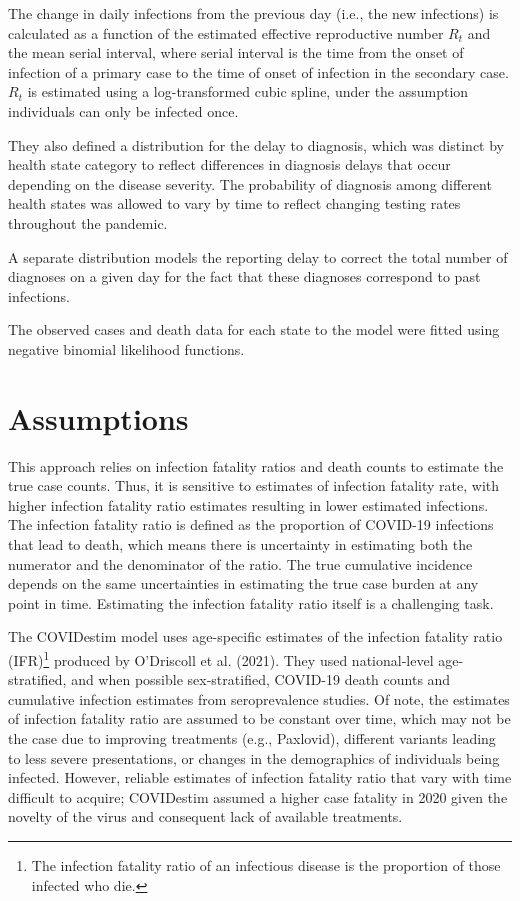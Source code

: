 \documentclass[12pt,twoside]{smiththesis}
\begin{document}
The change in daily infections from the previous day (i.e., the new infections) is calculated as a function of the estimated effective reproductive number \(R_t\) and the mean serial interval, where serial interval is the time from the onset of infection of a primary case to the time of onset of infection in the secondary case. \(R_t\) is estimated using a log-transformed cubic spline, under the assumption individuals can only be infected once.

They also defined a distribution for the delay to diagnosis, which was distinct by health state category to reflect differences in diagnosis delays that occur depending on the disease severity.
The probability of diagnosis among different health states was allowed to vary by time to reflect changing testing rates throughout the pandemic.

A separate distribution models the reporting delay to correct the total number of diagnoses on a given day for the fact that these diagnoses correspond to past infections.

The observed cases and death data for each state to the model were fitted using negative binomial likelihood functions.

\hypertarget{assumptions}{%
\section{Assumptions}\label{assumptions}}

This approach relies on infection fatality ratios and death counts to estimate the true case counts. Thus, it is sensitive to estimates of infection fatality rate, with higher infection fatality ratio estimates resulting in lower estimated infections. The infection fatality ratio is defined as the proportion of COVID-19 infections that lead to death, which means there is uncertainty in estimating both the numerator and the denominator of the ratio. The true cumulative incidence depends on the same uncertainties in estimating the true case burden at any point in time. Estimating the infection fatality ratio itself is a challenging task.

The COVIDestim model uses age-specific estimates of the infection fatality ratio (IFR)\footnote{The infection fatality ratio of an infectious disease is the proportion of those infected who die.} produced by O'Driscoll et al. (2021). They used national-level age-stratified, and when possible sex-stratified, COVID-19 death counts and cumulative infection estimates from seroprevalence studies. Of note, the estimates of infection fatality ratio are assumed to be constant over time, which may not be the case due to improving treatments (e.g., Paxlovid), different variants leading to less severe presentations, or changes in the demographics of individuals being infected. However, reliable estimates of infection fatality ratio that vary with time difficult to acquire; COVIDestim assumed a higher case fatality in 2020 given the novelty of the virus and consequent lack of available treatments.
\end{document}
